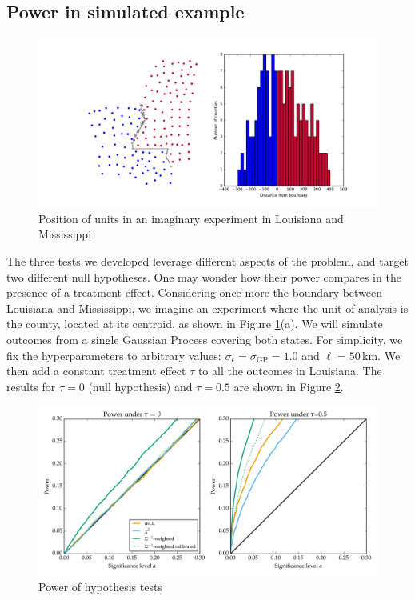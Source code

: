 \documentclass[letter]{article}
\makeatletter
\def\maxwidth{\ifdim\Gin@nat@width>\linewidth\linewidth
\else\Gin@nat@width\fi}
\let\Oldincludegraphics\includegraphics
\renewcommand{\includegraphics}[1]{\Oldincludegraphics[width=.8\maxwidth]{#1}}
\newcommand{\sigmaf}{\sigma_{\mathrm{GP}}}
\newcommand{\sigman}{\sigma_{\epsilon}}
\makeatother
\begin{document}
    	\subsection{Power in simulated example}\label{power-in-simulated-example}

\begin{figure}
\centering
\includegraphics{figures/mississippi_counties.png}
\caption{\label{fig:mississippi_counties}Position of units in an imaginary experiment in Louisiana and Mississippi}
\end{figure}

The three tests we developed leverage different aspects of the problem, and target two different null hypotheses. One may wonder how their power compares in the presence of a treatment effect. Considering once more the boundary between Louisiana and Mississippi, we imagine an experiment where the unit of analysis is the county, located at its centroid, as shown in Figure \ref{fig:mississippi_counties}(a).
We will simulate outcomes from a single Gaussian Process covering both states. For simplicity, we fix the hyperparameters to arbitrary values: \(\sigman=\sigmaf=1.0\) and \(\ell=50\,\mathrm{km}\). We then add a constant treatment effect \(\tau\) to all the outcomes in Louisiana. The results for \(\tau=0\) (null hypothesis) and \(\tau=0.5\) are shown in Figure \ref{fig:power}.

\begin{figure}
\centering
\includegraphics{figures/power_HT.png}
\caption{\label{fig:power} Power of hypothesis tests}
\end{figure}
\end{document}
